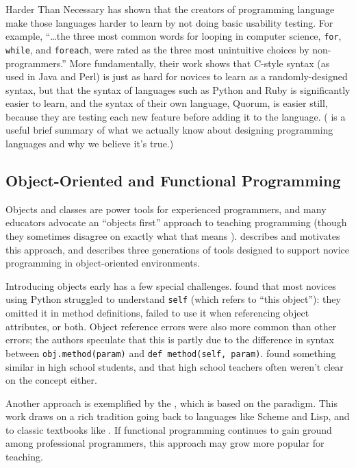 \begin{aside}{Harder Than Necessary}
  \cite{Stef2013} has shown that the creators of programming language
  make those languages harder to learn by not doing basic usability
  testing. For example, ``{\ldots}the three most common words for
  looping in computer science, \texttt{for}, \texttt{while}, and \texttt{foreach}, were rated
  as the three most unintuitive choices by non-programmers.'' More
  fundamentally, their work shows that C-style syntax (as used in Java
  and Perl) is just as hard for novices to learn as a randomly-designed
  syntax, but that the syntax of languages such as Python and Ruby is
  significantly easier to learn, and the syntax of their own language,
  Quorum, is easier still, because they are testing each new feature
  before adding it to the language. (\cite{Stef2017} is a useful
  brief summary of what we actually know about designing programming
  languages and why we believe it's true.)
\end{aside}

\subsection*{Object-Oriented and Functional Programming}

Objects and classes are power tools for experienced programmers, and
many educators advocate an ``objects first'' approach to teaching
programming (though they sometimes disagree on exactly what that means
\cite{Benn2007b}). \cite{Sorv2014} describes and motivates this
approach, and \cite{Koll2015} describes three generations of tools
designed to support novice programming in object-oriented environments.

Introducing objects early has a few special challenges.
\cite{Mill2016b} found that most novices using Python struggled to
understand \texttt{self} (which refers to ``this object''): they omitted it in
method definitions, failed to use it when referencing object attributes,
or both. Object reference errors were also more common than other
errors; the authors speculate that this is partly due to the difference
in syntax between \texttt{obj.method(param)} and \texttt{def\ method(self,\ param)}.
\cite{Rago2017} found something similar in high school students, and
that high school teachers often weren't clear on the concept either.

Another approach is exemplified by the ,
which is based on the  paradigm. This work draws on a
rich tradition going back to languages like Scheme and Lisp, and to
classic textbooks like
\cite{Fell2001,Frie1995,Abel1996}. If functional
programming continues to gain ground among professional programmers,
this approach may grow more popular for teaching.

